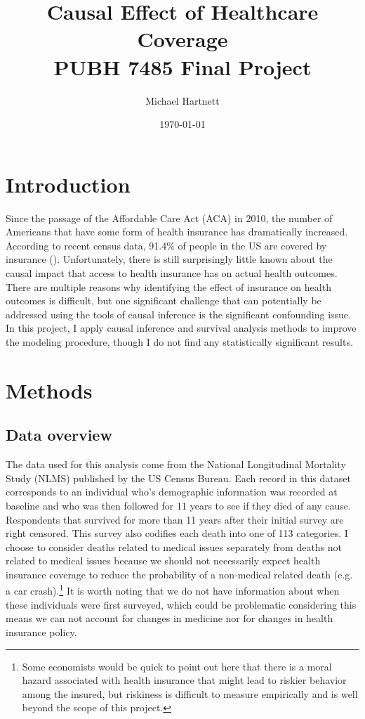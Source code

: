 \documentclass{article}
\title{Causal Effect of Healthcare Coverage \\[1ex] \large PUBH 7485 Final Project}
\author{Michael Hartnett}
\date{\today}
\begin{document}
\maketitle

\section{Introduction}
Since the passage of the Affordable Care Act (ACA) in 2010, the number of Americans that have some form of health insurance has dramatically increased. According to recent census data, 91.4\% of people in the US are covered by insurance (\cite{keisler2021health}). Unfortunately, there is still surprisingly little known about the causal impact that access to health insurance has on actual health outcomes. There are multiple reasons why identifying the effect of insurance on health outcomes is difficult, but one significant challenge that can potentially be addressed using the tools of causal inference is the significant confounding issue. In this project, I apply causal inference and survival analysis methods to improve the modeling procedure, though I do not find any statistically significant results. 



\section{Methods}
\subsection{Data overview}
The data used for this analysis come from the National Longitudinal Mortality Study (NLMS) published by the US Census Bureau. Each record in this dataset corresponds to an individual who's demographic information was recorded at baseline and who was then followed for 11 years to see if they died of any cause. Respondents that survived for more than 11 years after their initial survey are right censored. This survey also codifies each death into one of 113 categories. I choose to consider deaths related to medical issues separately from deaths not related to medical issues because we should not necessarily expect health insurance coverage to reduce the probability of a non-medical related death (e.g. a car crash).\footnote{Some economists would be quick to point out here that there is a moral hazard associated with health insurance that might lead to riskier behavior among the insured, but riskiness is difficult to measure empirically and is well beyond the scope of this project.} It is worth noting that we do not have information about when these individuals were first surveyed, which could be problematic considering this means we can not account for changes in medicine nor for changes in health insurance policy. 
\end{document}
